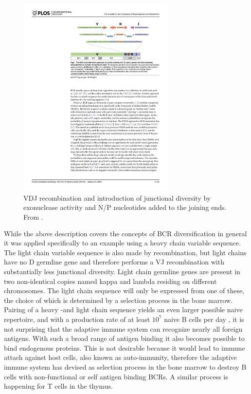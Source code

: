 \begin{figure}
    \centering
    \includegraphics[width=0.7\textwidth]{figures/VDJ_recomb.pdf}
    \caption{
        \label{fig:VDJ_recomb}
        VDJ recombination and introduction of junctional diversity by exonuclease activity and N/P nucleotides added to the joining ends.
        From \cite{ralph2016consistency}.
    }
\end{figure}


While the above description covers the concepts of BCR diversification in general it was applied specifically to an example using a heavy chain variable sequence.
The light chain variable sequence is also made by recombination, but light chains have no D germline gene and therefore performs a VJ recombination with substantially less junctional diversity.
Light chain germline genes are present in two non-identical copies named kappa and lambda residing on different chromosomes.
The light chain sequence will only be expressed from one of these, the choice of which is determined by a selection process in the bone marrow.
Pairing of a heavy -and light chain sequence yields an even larger possible naive repertoire, and with a production rate of at least $10^7$ naive B cells per day \cite{murphy2008immunobiology}, it is not surprising that the adaptive immune system can recognize nearly all foreign antigens.
With such a broad range of antigen binding it also becomes possible to bind endogenous proteins.
This is not desirable because it would lead to immune attach against host cells, also known as auto-immunity, therefore the adaptive immune system has devised as selection process in the bone marrow to destroy B cells with non-functional or self antigen binding BCRs.
A similar process is happening for T cells in the thymus.




